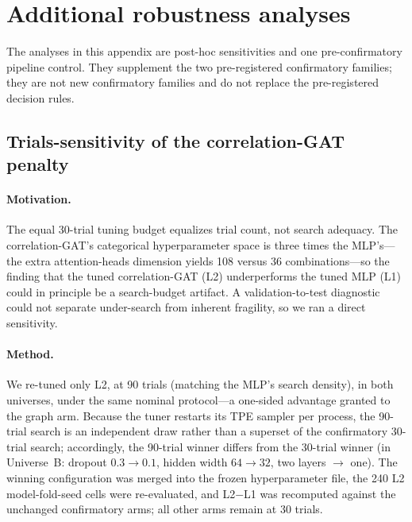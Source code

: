 \documentclass{article}
\begin{document}
\section{Additional robustness analyses}\label{app:robust}

The analyses in this appendix are post-hoc sensitivities and one pre-confirmatory
pipeline control. They supplement the two pre-registered confirmatory families;
they are not new confirmatory families and do not replace the pre-registered
decision rules.

\subsection{Trials-sensitivity of the correlation-GAT penalty}\label{app:robust:trials}

\paragraph{Motivation.}
The equal 30-trial tuning budget equalizes trial count, not search adequacy. The
correlation-GAT's categorical hyperparameter space is three times the MLP's---the
extra attention-heads dimension yields 108 versus 36 combinations---so the finding
that the tuned correlation-GAT (L2) underperforms the tuned MLP (L1) could in
principle be a search-budget artifact. A validation-to-test diagnostic could not
separate under-search from inherent fragility, so we ran a direct sensitivity.

\paragraph{Method.}
We re-tuned only L2, at 90 trials (matching the MLP's search density), in both
universes, under the same nominal protocol---a one-sided advantage granted to the
graph arm. Because the tuner restarts its TPE sampler per process, the 90-trial
search is an independent draw rather than a superset of the confirmatory 30-trial
search; accordingly, the 90-trial winner differs from the 30-trial winner (in
Universe~B: dropout $0.3\to0.1$, hidden width $64\to32$, two layers $\to$ one).
The winning configuration was merged into the frozen hyperparameter file, the 240
L2 model-fold-seed cells were re-evaluated, and L2$-$L1 was recomputed against the
unchanged confirmatory arms; all other arms remain at 30 trials.
\end{document}
